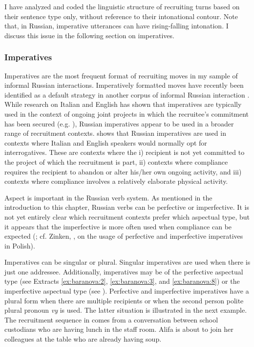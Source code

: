 \documentclass[output=paper,modfonts,nonflat]{langsci/langscibook}
\begin{document}
I have analyzed and coded the linguistic structure of recruiting turns based on their sentence type only, without reference to their intonational contour. Note that, in Russian, imperative utterances can have rising-falling intonation. I discuss this issue in the following section on imperatives.

\subsubsection{Imperatives}

Imperatives are the most frequent format of recruiting moves in my sample of informal Russian interactions. Imperatively formatted moves have recently been identified as a default strategy in another corpus of informal Russian interaction \citep{bolden2017}. While research on Italian and English has shown that imperatives are typically used in the context of ongoing joint projects in which the recruitee’s commitment has been secured (e.g. \citealt{Rossi2012,Rossi2015a,Zinken2016}), Russian imperatives appear to be used in a broader range of recruitment contexts. \citet{bolden2017} shows that Russian imperatives are used in contexts where Italian and English speakers would normally opt for interrogatives. These are contexts where the i) recipient is not yet committed to the project of which the recruitment is part, ii) contexts where compliance requires the recipient to abandon or alter his/her own ongoing activity, and iii) contexts where compliance involves a relatively elaborate physical activity.

Aspect is important in the Russian verb system. As mentioned in the introduction to this chapter, Russian verbs can be perfective or imperfective. It is not yet entirely clear which recruitment contexts prefer which aspectual type, but it appears that the imperfective is more often used when compliance can be expected (\citealt{Benacchio2002}; cf. Zinken, ,  on the usage of perfective and imperfective imperatives in Polish).

Imperatives can be singular or plural. Singular imperatives are used when there is just one addressee. Additionally, imperatives may be of the perfective aspectual type (see Extracts \ref{ex:baranova:2}, \ref{ex:baranova:3}, and \ref{ex:baranova:8}) or the imperfective aspectual type (see ). Perfective and imperfective imperatives have a plural form when there are multiple recipients or when the second person polite plural pronoun \textit{vy} is used. The latter situation is illustrated in the next example. The recruitment sequence in  comes from a conversation between school custodians who are having lunch in the staff room. Alifa is about to join her colleagues at the table who are already having soup.
\end{document}
